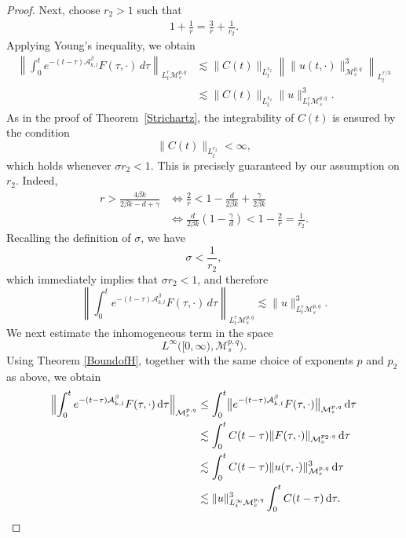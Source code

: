 \documentclass[12pt,reqno,a4paper]{amsart}
\numberwithin{equation}{section}
\theoremstyle{plain}
\theoremstyle{definition}
\theoremstyle{remark}
\def\M{\mathcal{M}}
\def \Ad{\mathcal{A}_{k,l}}
\def \M{{\mathcal M}}
\begin{document}
\begin{proof}
Next, choose $r_{2}>1$ such that
\begin{align}
\label{r2}
1+\frac{1}{r}
=
\frac{3}{r}+\frac{1}{r_{2}}.
\end{align}
Applying Young's inequality, we obtain
\begin{align*}
\left\|
\int_{0}^{t}
e^{-(t-\tau)\Ad^{\beta}}
F(\tau,\cdot)\,d\tau
\right\|_{L^{r}_{t}\M^{p,q}_{s}}
&\lesssim
\|C(t)\|_{L^{r_{2}}_{t}}
\left\|
\|u(t,\cdot)\|_{\M^{p,q}_{s}}^{3}
\right\|_{L^{r/3}_{t}}
\\
&\lesssim
\|C(t)\|_{L^{r_{2}}_{t}}
\|u\|_{L^{r}_{t}\M^{p,q}_{s}}^{3}.
\end{align*}
As in the proof of Theorem~\ref{Strichartz}, the integrability of  $C(t)$ is ensured by the condition
\[
\|C(t)\|_{L^{r_{2}}_{t}}<\infty,
\]
which holds whenever $\sigma r_{2}<1$. This is precisely guaranteed by our assumption on $r_{2}$. Indeed,
\begin{align*}
r>\frac{4\beta k}{2\beta k-d+\gamma}
&\iff
\frac{2}{r}
<
1-\frac{d}{2\beta k}
+\frac{\gamma}{2\beta k}
\\
&\iff
\frac{d}{2\beta k}
\left(1-\frac{\gamma}{d}\right)
<
1-\frac{2}{r}
=
\frac{1}{r_{2}}.
\end{align*}
Recalling the definition of $\sigma$, we have
\[
\sigma<\frac{1}{r_{2}},
\]
which immediately implies that $\sigma r_{2}<1$, and therefore
\begin{equation}
\label{inhm2}
\left\|
\int_{0}^{t}
e^{-(t-\tau)\Ad^{\beta}}
F(\tau,\cdot)\,d\tau
\right\|_{L^{r}_{t}\M^{p,q}_{s}}
\lesssim
\|u\|_{L^{r}_{t}\M^{p,q}_{s}}^{3}.
\end{equation}
We next estimate the inhomogeneous term in the space
\[
L^{\infty}\bigl([0,\infty),\M^{p,q}_{s}\bigr).
\]
Using Theorem \ref{BoundofH}, together with the same choice of exponents $p$ and $p_{2}$ as above, we obtain
\begin{align*}
\Bigl\|
\int_{0}^{t}
e^{-(t-\tau)\Ad^{\beta}}
F(\tau,\cdot)\,\mathrm{d}\tau
\Bigr\|_{\M^{p,q}_{s}}
&\leq
\int_{0}^{t}
\bigl\|
e^{-(t-\tau)\Ad^{\beta}}
F(\tau,\cdot)
\bigr\|_{\M^{p,q}_{s}}
\,\mathrm{d}\tau
\\
&\lesssim
\int_{0}^{t}
C(t-\tau)
\|F(\tau,\cdot)\|_{\M^{p_{2},q}_{s}}
\,\mathrm{d}\tau
\\
&\lesssim
\int_{0}^{t}
C(t-\tau)
\|u(\tau,\cdot)\|_{\M^{p,q}_{s}}^{3}
\,\mathrm{d}\tau
\\
&\lesssim
\|u\|_{L^{\infty}_{t}\M^{p,q}_{s}}^{3}
\int_{0}^{t}
C(t-\tau)\,\mathrm{d}\tau.
\end{align*}


\end{proof}
\end{document}
